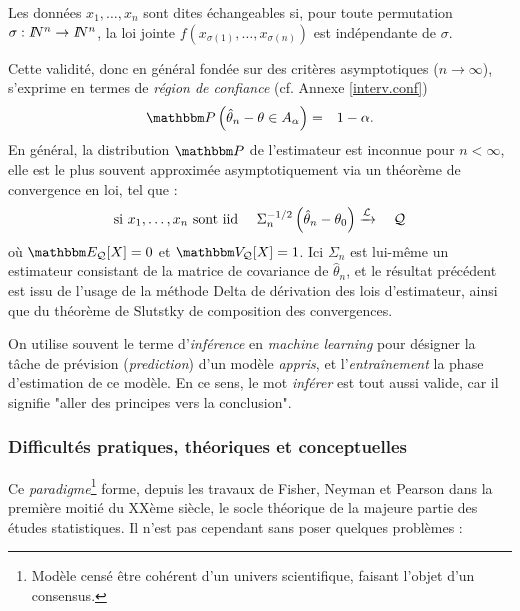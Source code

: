 \begin{definition}[\'Echangeabilité.]
Les données $x_1,\ldots,x_n$ sont dites échangeables si, pour toute permutation $\sigma:I\!\!N^n\to I\!\!N^n$, la loi jointe  $f(x_{\sigma(1)},\ldots,x_{\sigma(n)})$ est indépendante de $\sigma$.
\end{definition}

Cette validité, donc en général fondée sur des critères asymptotiques ($n\to\infty$), s'exprime en termes de \emph{région de confiance} (cf. Annexe \ref{interv.conf})
\begin{eqnarray*}
\Pp\left(\hat{\theta}_n - \theta \in A_{\alpha}\right) & = & 1-\alpha.
\end{eqnarray*}
 En général, la distribution $\Pp$ de l'estimateur est inconnue pour $n<\infty$, elle est le plus souvent approximée {asymptotiquement} via un théorème de convergence en loi, tel que :
\begin{eqnarray*}
\text{si $x_1,\ldots,x_n$ sont iid} \ \ \ \ \Sigma^{-1/2}_n \left(\hat{\theta}_n - \theta_0\right) & \xrightarrow{{\cal{L}}}{} & {\cal{Q}}
\end{eqnarray*}
où $\E_{{\cal{Q}}}[X]=0$ et $\V_{{\cal{Q}}}[X]=1$. Ici $\Sigma_n$ est lui-même un estimateur consistant de la matrice de covariance de $\hat{\theta}_n$, et le résultat précédent est issu de l'usage de la méthode Delta de dérivation des lois d'estimateur, ainsi que du théorème de Slutstky de composition des convergences. 

\begin{remark}
On utilise souvent le terme d'\emph{inférence} en {\it machine learning} pour désigner la tâche de prévision (\emph{prediction}) d'un modèle {\it appris}, et l'\textit{entraînement} la phase d'estimation de ce modèle. En ce sens, le mot \emph{inférer} est tout aussi valide, car il signifie "aller des principes vers la conclusion".   
\end{remark}

\subsubsection{Difficultés pratiques, théoriques et conceptuelles}

Ce \emph{paradigme}\footnote{Modèle censé être cohérent d'un univers scientifique, faisant l'objet d'un consensus.} forme, depuis les travaux de Fisher, Neyman et Pearson dans la première moitié du XXème siècle, le socle théorique de la majeure partie des études statistiques. {Il n'est pas cependant sans poser quelques problèmes} :

